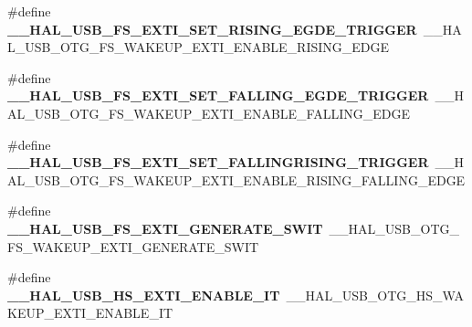 \begin{DoxyCompactItemize}
\item 
\hypertarget{group___h_a_l___u_s_b___aliased___macros_ga0b77287493d393b314f03576b105134e}{\#define {\bfseries \-\_\-\-\_\-\-H\-A\-L\-\_\-\-U\-S\-B\-\_\-\-F\-S\-\_\-\-E\-X\-T\-I\-\_\-\-S\-E\-T\-\_\-\-R\-I\-S\-I\-N\-G\-\_\-\-E\-G\-D\-E\-\_\-\-T\-R\-I\-G\-G\-E\-R}~\-\_\-\-\_\-\-H\-A\-L\-\_\-\-U\-S\-B\-\_\-\-O\-T\-G\-\_\-\-F\-S\-\_\-\-W\-A\-K\-E\-U\-P\-\_\-\-E\-X\-T\-I\-\_\-\-E\-N\-A\-B\-L\-E\-\_\-\-R\-I\-S\-I\-N\-G\-\_\-\-E\-D\-G\-E}\label{group___h_a_l___u_s_b___aliased___macros_ga0b77287493d393b314f03576b105134e}

\item 
\hypertarget{group___h_a_l___u_s_b___aliased___macros_ga68573497dbc5121fc85cc2c1b5ef14e0}{\#define {\bfseries \-\_\-\-\_\-\-H\-A\-L\-\_\-\-U\-S\-B\-\_\-\-F\-S\-\_\-\-E\-X\-T\-I\-\_\-\-S\-E\-T\-\_\-\-F\-A\-L\-L\-I\-N\-G\-\_\-\-E\-G\-D\-E\-\_\-\-T\-R\-I\-G\-G\-E\-R}~\-\_\-\-\_\-\-H\-A\-L\-\_\-\-U\-S\-B\-\_\-\-O\-T\-G\-\_\-\-F\-S\-\_\-\-W\-A\-K\-E\-U\-P\-\_\-\-E\-X\-T\-I\-\_\-\-E\-N\-A\-B\-L\-E\-\_\-\-F\-A\-L\-L\-I\-N\-G\-\_\-\-E\-D\-G\-E}\label{group___h_a_l___u_s_b___aliased___macros_ga68573497dbc5121fc85cc2c1b5ef14e0}

\item 
\hypertarget{group___h_a_l___u_s_b___aliased___macros_ga9ea9069919f81db08800a1b92ee2c6ed}{\#define {\bfseries \-\_\-\-\_\-\-H\-A\-L\-\_\-\-U\-S\-B\-\_\-\-F\-S\-\_\-\-E\-X\-T\-I\-\_\-\-S\-E\-T\-\_\-\-F\-A\-L\-L\-I\-N\-G\-R\-I\-S\-I\-N\-G\-\_\-\-T\-R\-I\-G\-G\-E\-R}~\-\_\-\-\_\-\-H\-A\-L\-\_\-\-U\-S\-B\-\_\-\-O\-T\-G\-\_\-\-F\-S\-\_\-\-W\-A\-K\-E\-U\-P\-\_\-\-E\-X\-T\-I\-\_\-\-E\-N\-A\-B\-L\-E\-\_\-\-R\-I\-S\-I\-N\-G\-\_\-\-F\-A\-L\-L\-I\-N\-G\-\_\-\-E\-D\-G\-E}\label{group___h_a_l___u_s_b___aliased___macros_ga9ea9069919f81db08800a1b92ee2c6ed}

\item 
\hypertarget{group___h_a_l___u_s_b___aliased___macros_gacd4ec43a3a9636070ad5546851ea6623}{\#define {\bfseries \-\_\-\-\_\-\-H\-A\-L\-\_\-\-U\-S\-B\-\_\-\-F\-S\-\_\-\-E\-X\-T\-I\-\_\-\-G\-E\-N\-E\-R\-A\-T\-E\-\_\-\-S\-W\-I\-T}~\-\_\-\-\_\-\-H\-A\-L\-\_\-\-U\-S\-B\-\_\-\-O\-T\-G\-\_\-\-F\-S\-\_\-\-W\-A\-K\-E\-U\-P\-\_\-\-E\-X\-T\-I\-\_\-\-G\-E\-N\-E\-R\-A\-T\-E\-\_\-\-S\-W\-I\-T}\label{group___h_a_l___u_s_b___aliased___macros_gacd4ec43a3a9636070ad5546851ea6623}

\item 
\hypertarget{group___h_a_l___u_s_b___aliased___macros_ga57d438cdca8b644cd03124ffcb8ca763}{\#define {\bfseries \-\_\-\-\_\-\-H\-A\-L\-\_\-\-U\-S\-B\-\_\-\-H\-S\-\_\-\-E\-X\-T\-I\-\_\-\-E\-N\-A\-B\-L\-E\-\_\-\-I\-T}~\-\_\-\-\_\-\-H\-A\-L\-\_\-\-U\-S\-B\-\_\-\-O\-T\-G\-\_\-\-H\-S\-\_\-\-W\-A\-K\-E\-U\-P\-\_\-\-E\-X\-T\-I\-\_\-\-E\-N\-A\-B\-L\-E\-\_\-\-I\-T}\label{group___h_a_l___u_s_b___aliased___macros_ga57d438cdca8b644cd03124ffcb8ca763}


\end{DoxyCompactItemize}
